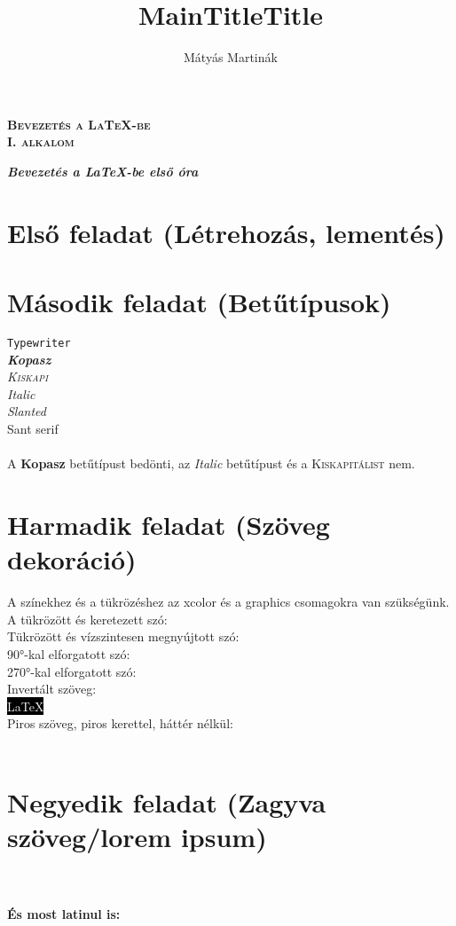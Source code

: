 \documentclass{book}
\begin{document}
	\begin{titlepage}
		\begin{center}
			\title{MainTitle}\textbf{\huge{\textsc{Bevezetés a \LaTeX-be\\
			\textbf{I. alkalom}}}}
		\end{center}
	\end{titlepage}
\title{Title}\textbf{\huge{\textit{Bevezetés a \LaTeX-be első óra}}}
\author{Mátyás Martinák}
\section{Első feladat (Létrehozás, lementés)}
\section{Második feladat (Betűtípusok)}
	\texttt{Typewriter}\\
	\emph{\textbf{Kopasz}}\\
	\emph{\textsc{Kiskapi}}\\
	\emph{\textit{Italic}}\\
	\textsl{Slanted}\\
	\textsf{Sant serif}\\\\
	A \textbf{Kopasz} betűtípust bedönti, az \textit{Italic} betűtípust és a \textsc{Kiskapitálist} nem.
\section{Harmadik feladat (Szöveg dekoráció)}
	A színekhez és a tükrözéshez az xcolor és a graphics csomagokra van szükségünk.\\
	A tükrözött és keretezett szó: \\
	Tükrözött és vízszintesen megnyújtott szó: \scalebox{2.0}{\scalebox{-1}[1]{\hulipsum[1]}}\\
	90°-kal elforgatott szó: \\
	270°-kal elforgatott szó: \\
	Invertált szöveg:\\
	\colorbox{black}{\textcolor{white}{\LaTeX}}\\
	Piros szöveg, piros kerettel, háttér nélkül:\\
	\\
\section{Negyedik feladat (Zagyva szöveg/lorem ipsum)}
	\hulipsum[1]\\\\
	\textbf{És most latinul is:}\\
	\begin{flushright}
		\begin{otherlanguage}{latin}
			\lipsum[1]
		\end{otherlanguage}
	\end{flushright}
	\linespread{2}
\end{document}

